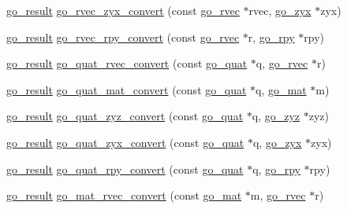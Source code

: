 \begin{DoxyCompactItemize}
\item 
\hyperlink{gotypes_8h_a55d48b38cd959f63c7e8db8337a9792a}{go\-\_\-result} \hyperlink{namespacegomotion_a1ba2b7da6d49b4ead52117a0d424cbb0}{go\-\_\-rvec\-\_\-zyx\-\_\-convert} (const \hyperlink{structgomotion_1_1go__rvec}{go\-\_\-rvec} $\ast$rvec, \hyperlink{structgomotion_1_1go__zyx}{go\-\_\-zyx} $\ast$zyx)
\item 
\hyperlink{gotypes_8h_a55d48b38cd959f63c7e8db8337a9792a}{go\-\_\-result} \hyperlink{namespacegomotion_a9eec26c29c252c49373f7871e573a3ad}{go\-\_\-rvec\-\_\-rpy\-\_\-convert} (const \hyperlink{structgomotion_1_1go__rvec}{go\-\_\-rvec} $\ast$r, \hyperlink{structgomotion_1_1go__rpy}{go\-\_\-rpy} $\ast$rpy)
\item 
\hyperlink{gotypes_8h_a55d48b38cd959f63c7e8db8337a9792a}{go\-\_\-result} \hyperlink{namespacegomotion_aba2fc0381e9085e8bedcde7c543a0b1a}{go\-\_\-quat\-\_\-rvec\-\_\-convert} (const \hyperlink{structgomotion_1_1go__quat}{go\-\_\-quat} $\ast$q, \hyperlink{structgomotion_1_1go__rvec}{go\-\_\-rvec} $\ast$r)
\item 
\hyperlink{gotypes_8h_a55d48b38cd959f63c7e8db8337a9792a}{go\-\_\-result} \hyperlink{namespacegomotion_adb5fb3eb9abe8e8e6a96ec2c5bdf3857}{go\-\_\-quat\-\_\-mat\-\_\-convert} (const \hyperlink{structgomotion_1_1go__quat}{go\-\_\-quat} $\ast$q, \hyperlink{structgomotion_1_1go__mat}{go\-\_\-mat} $\ast$m)
\item 
\hyperlink{gotypes_8h_a55d48b38cd959f63c7e8db8337a9792a}{go\-\_\-result} \hyperlink{namespacegomotion_a7465dd12350d9c9fc9b59ef619796071}{go\-\_\-quat\-\_\-zyz\-\_\-convert} (const \hyperlink{structgomotion_1_1go__quat}{go\-\_\-quat} $\ast$q, \hyperlink{structgomotion_1_1go__zyz}{go\-\_\-zyz} $\ast$zyz)
\item 
\hyperlink{gotypes_8h_a55d48b38cd959f63c7e8db8337a9792a}{go\-\_\-result} \hyperlink{namespacegomotion_a4e32c0da5973b4a837a29bcd4f46a166}{go\-\_\-quat\-\_\-zyx\-\_\-convert} (const \hyperlink{structgomotion_1_1go__quat}{go\-\_\-quat} $\ast$q, \hyperlink{structgomotion_1_1go__zyx}{go\-\_\-zyx} $\ast$zyx)
\item 
\hyperlink{gotypes_8h_a55d48b38cd959f63c7e8db8337a9792a}{go\-\_\-result} \hyperlink{namespacegomotion_a8c4bdba65a6b7ff8b6201e84ddde1fe2}{go\-\_\-quat\-\_\-rpy\-\_\-convert} (const \hyperlink{structgomotion_1_1go__quat}{go\-\_\-quat} $\ast$q, \hyperlink{structgomotion_1_1go__rpy}{go\-\_\-rpy} $\ast$rpy)
\item 
\hyperlink{gotypes_8h_a55d48b38cd959f63c7e8db8337a9792a}{go\-\_\-result} \hyperlink{namespacegomotion_a0ece2b09a5698233266153dad1cc1896}{go\-\_\-mat\-\_\-rvec\-\_\-convert} (const \hyperlink{structgomotion_1_1go__mat}{go\-\_\-mat} $\ast$m, \hyperlink{structgomotion_1_1go__rvec}{go\-\_\-rvec} $\ast$r)

\end{DoxyCompactItemize}

